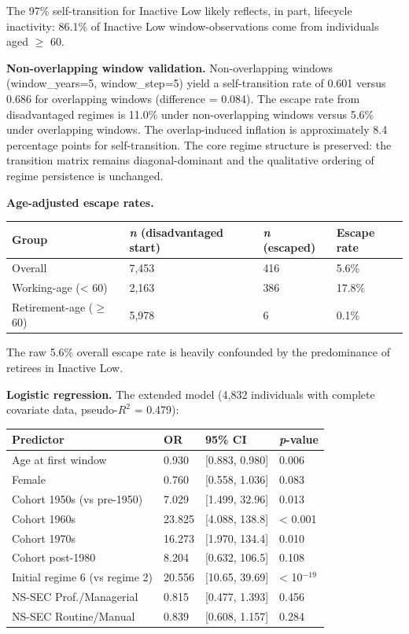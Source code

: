 The 97\% self-transition for Inactive Low likely reflects, in part, lifecycle inactivity: 86.1\% of Inactive Low window-observations come from individuals aged $\geq$ 60.

\textbf{Non-overlapping window validation.} Non-overlapping windows (window\_years=5, window\_step=5) yield a self-transition rate of 0.601 versus 0.686 for overlapping windows (difference = 0.084). The escape rate from disadvantaged regimes is 11.0\% under non-overlapping windows versus 5.6\% under overlapping windows. The overlap-induced inflation is approximately 8.4 percentage points for self-transition. The core regime structure is preserved: the transition matrix remains diagonal-dominant and the qualitative ordering of regime persistence is unchanged.

\textbf{Age-adjusted escape rates.}

\begin{tabular}{llll}
\toprule
Group & \textit{n} (disadvantaged start) & \textit{n} (escaped) & Escape rate \\
\midrule
Overall & 7,453 & 416 & 5.6\% \\
Working-age (< 60) & 2,163 & 386 & 17.8\% \\
Retirement-age ($\geq$ 60) & 5,978 & 6 & 0.1\% \\
\bottomrule
\end{tabular}

The raw 5.6\% overall escape rate is heavily confounded by the predominance of retirees in Inactive Low.

\textbf{Logistic regression.} The extended model (4,832 individuals with complete covariate data, pseudo-$R^2$ = 0.479):

\begin{tabular}{llll}
\toprule
Predictor & OR & 95\% CI & \textit{p}-value \\
\midrule
Age at first window & 0.930 & [0.883, 0.980] & 0.006 \\
Female & 0.760 & [0.558, 1.036] & 0.083 \\
Cohort 1950s (vs pre-1950) & 7.029 & [1.499, 32.96] & 0.013 \\
Cohort 1960s & 23.825 & [4.088, 138.8] & < 0.001 \\
Cohort 1970s & 16.273 & [1.970, 134.4] & 0.010 \\
Cohort post-1980 & 8.204 & [0.632, 106.5] & 0.108 \\
Initial regime 6 (vs regime 2) & 20.556 & [10.65, 39.69] & < 10$^{-19}$ \\
NS-SEC Prof./Managerial & 0.815 & [0.477, 1.393] & 0.456 \\
NS-SEC Routine/Manual & 0.839 & [0.608, 1.157] & 0.284 \\
\bottomrule
\end{tabular}

